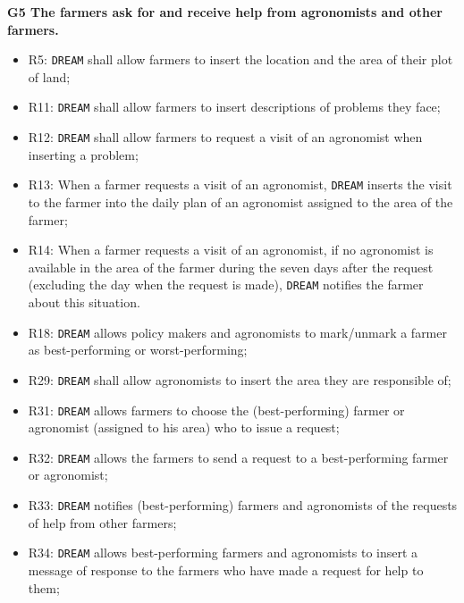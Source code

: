 \documentclass{article}
\begin{document}
\vspace{5mm}
\textbf{G5 The farmers ask for and receive help from agronomists and other farmers.}
\begin{itemize}
    \item R5: \verb|DREAM| shall allow farmers to insert the location and the area of their plot of land;
    
    \item R11: \verb|DREAM| shall allow farmers to insert descriptions of problems they face;
    
  \item R12: \verb|DREAM| shall allow farmers to request a visit of an agronomist when inserting a problem;

  \item R13: When a farmer requests a visit of an agronomist, \verb|DREAM| inserts the visit to the farmer into the daily plan of an agronomist assigned to the area of the farmer;

  \item R14: When a farmer requests a visit of an agronomist, if no agronomist is available in the area of the farmer during the seven days after the request (excluding the day when the request is made), \verb|DREAM| notifies the farmer about this situation.
    
    \item R18: \verb|DREAM| allows policy makers and agronomists to mark/unmark a farmer as best-performing or worst-performing;
    
    \item R29: \verb|DREAM| shall allow agronomists to insert the area they are responsible of;
  
    \item R31: \verb|DREAM| allows farmers to choose the (best-performing) farmer or agronomist (assigned to his area) who to issue a request;
  
    \item R32: \verb|DREAM| allows the farmers to send a request to a best-performing farmer or agronomist;
    
    \item R33: \verb|DREAM| notifies (best-performing) farmers and agronomists of the requests of help from other farmers;

    \item R34: \verb|DREAM| allows best-performing farmers and agronomists to insert a message of response to the farmers who have made a request for help to them;


\end{itemize}
\end{document}

